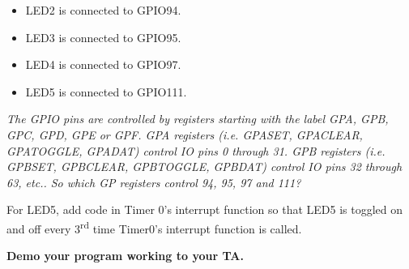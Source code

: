\documentclass[11pt]{article}
\begin{document}
\begin{itemize}
\begin{itemize}
            \item LED2 is connected to GPIO94.
            \item LED3 is connected to GPIO95.
            \item LED4 is connected to GPIO97.
            \item LED5 is connected to GPIO111.
        \end{itemize}
        \textit{The GPIO pins are controlled by registers starting with the label GPA, GPB, GPC, GPD, GPE or GPF. GPA registers (i.e. GPASET, GPACLEAR, GPATOGGLE, GPADAT) control IO pins 0 through 31. GPB registers (i.e. GPBSET, GPBCLEAR, GPBTOGGLE, GPBDAT) control IO pins 32 through 63, etc.. So which GP registers control 94, 95, 97 and 111?}

        For LED5, add code in Timer 0’s interrupt function so that LED5 is toggled on and off every 3\textsuperscript{rd} time Timer0’s interrupt function is called.
        \begin{checkoff}
                \textbf{Demo your program working to your TA.}
        \end{checkoff}
\end{itemize}
%
\Ex
\end{document}
